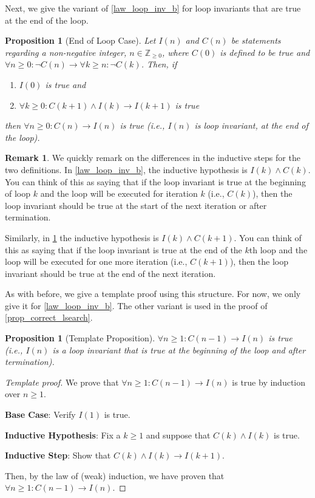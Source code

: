 \documentclass{article}
\newcommand{\ra}{\rightarrow}
\newcommand{\ZZ}{\mathbb{Z}_{\geq 0}}
\theoremstyle{plain}
\newtheorem{proposition}{Proposition}
\newtheorem*{proposition*}{Proposition}
\theoremstyle{definition}
\newtheorem{remark}{Remark}
\begin{document}
Next, we give the variant of \cref{law_loop_inv_b} for loop invariants that are true at the end of the loop.

\begin{proposition}[End of Loop Case]\label{law_loop_inv_e}
    Let \(I(n)\) and \(C(n)\) be statements regarding a non-negative integer, \(n \in \ZZ\), where \(C(0)\) is defined to be true and \(\forall n \geq 0: \lnot C(n) \ra \forall k \geq n : \lnot C(k)\). Then, if
    \begin{enumerate}
        \item \(I(0)\) is true and
        \item \(\forall k \geq 0 : C(k+1) \land I(k) \ra I(k+1)\) is true
    \end{enumerate}    
    then \(\forall n \geq 0 : C(n) \ra I(n)\) is true (i.e., \(I(n)\) is loop invariant, at the end of the loop).
\end{proposition}

\begin{remark}
    We quickly remark on the differences in the inductive steps for the two definitions. In \cref{law_loop_inv_b}, the inductive hypothesis is \(I(k) \land C(k)\). You can think of this as saying that if the loop invariant is true at the beginning of loop \(k\) and the loop will be executed for iteration \(k\) (i.e., \(C(k)\)), then the loop invariant should be true at the start of the next iteration or after termination.

    Similarly, in \cref{law_loop_inv_e} the inductive hypothesis is \(I(k) \land C(k+1)\). You can think of this as saying that if the loop invariant is true at the end of the \(k\)th loop and the loop will be executed for one more iteration (i.e., \(C(k+1)\)), then the loop invariant should be true at the end of the next iteration.
\end{remark}

As with before, we give a template proof using this structure. For now, we only give it for \cref{law_loop_inv_b}. The other variant is used in the proof of \cref{prop_correct_lsearch}.

\begin{proposition*}[Template Proposition]
    \(\forall n \geq 1 : C(n-1) \ra I(n)\) is true (i.e., \(I(n)\) is a loop invariant that is true at the beginning of the loop and after termination).
\end{proposition*}
\begin{proof}[Template proof]
    We prove that \(\forall n \geq 1 : C(n-1) \ra I(n)\) is true by induction over \(n \geq 1\).
    
    \textbf{Base Case}: Verify \(I(1)\) is true.

    \textbf{Inductive Hypothesis}: Fix a \(k \geq 1\) and suppose that \(C(k) \land I(k)\) is true.

    \textbf{Inductive Step}: Show that \(C(k) \land I(k) \ra I(k+1)\).

    Then, by the law of (weak) induction, we have proven that \(\forall n \geq 1 : C(n-1) \ra I(n)\).
\end{proof}
\end{document}
